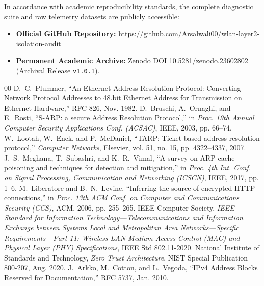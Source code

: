 \documentclass[conference]{IEEEtran}
\begin{document}
In accordance with academic reproducibility standards, the complete diagnostic suite and raw telemetry datasets are publicly accessible:
\begin{itemize}
    \item \textbf{Official GitHub Repository:} \href{https://github.com/Arsalwali00/wlan-layer2-isolation-audit}{https://github.com/Arsalwali00/wlan-layer2-isolation-audit}
    \item \textbf{Permanent Academic Archive:} Zenodo DOI \href{https://doi.org/10.5281/zenodo.23602802}{10.5281/zenodo.23602802} (Archival Release \texttt{v1.0.1}).
\end{itemize}

\begin{thebibliography}{00}
 D.~C.~Plummer, ``An Ethernet Address Resolution Protocol: Converting Network Protocol Addresses to 48.bit Ethernet Address for Transmission on Ethernet Hardware,'' RFC 826, Nov. 1982.
 D.~Bruschi, A.~Ornaghi, and E.~Rosti, ``S-ARP: a secure Address Resolution Protocol,'' in \textit{Proc. 19th Annual Computer Security Applications Conf. (ACSAC)}, IEEE, 2003, pp. 66--74.
 W.~Lootah, W.~Enck, and P.~McDaniel, ``TARP: Ticket-based address resolution protocol,'' \textit{Computer Networks}, Elsevier, vol. 51, no. 15, pp. 4322--4337, 2007.
 J.~S.~Meghana, T.~Subashri, and K.~R.~Vimal, ``A survey on ARP cache poisoning and techniques for detection and mitigation,'' in \textit{Proc. 4th Int. Conf. on Signal Processing, Communication and Networking (ICSCN)}, IEEE, 2017, pp. 1--6.
 M.~Liberatore and B.~N.~Levine, ``Inferring the source of encrypted HTTP connections,'' in \textit{Proc. 13th ACM Conf. on Computer and Communications Security (CCS)}, ACM, 2006, pp. 255--265.
 IEEE Computer Society, \textit{IEEE Standard for Information Technology---Telecommunications and Information Exchange between Systems Local and Metropolitan Area Networks---Specific Requirements - Part 11: Wireless LAN Medium Access Control (MAC) and Physical Layer (PHY) Specifications}, IEEE Std 802.11-2020.
 National Institute of Standards and Technology, \textit{Zero Trust Architecture}, NIST Special Publication 800-207, Aug. 2020.
 J.~Arkko, M.~Cotton, and L.~Vegoda, ``IPv4 Address Blocks Reserved for Documentation,'' RFC 5737, Jan. 2010.
\end{thebibliography}
\end{document}
